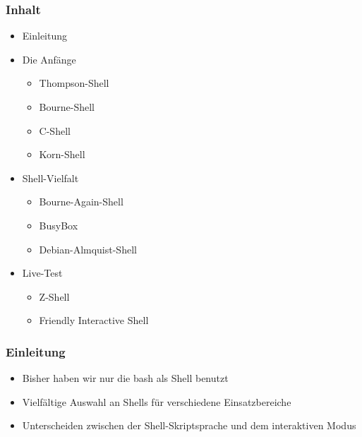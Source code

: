 \begin{frame}
    \titlepage
\end{frame}

\begin{frame}
    \frametitle{Inhalt}
    \begin{itemize}
        \item Einleitung
        \item Die Anfänge
        \begin{itemize}
            \item Thompson-Shell
            \item Bourne-Shell
            \item C-Shell
            \item Korn-Shell
        \end{itemize}
        \pause
        \item Shell-Vielfalt
        \begin{itemize}
            \item Bourne-Again-Shell
            \item BusyBox
            \item Debian-Almquist-Shell
        \end{itemize}
        \pause
        \item Live-Test
        \begin{itemize}
            \item Z-Shell
            \item Friendly Interactive Shell
        \end{itemize}
    \end{itemize}
\end{frame}

\begin{frame}
    \frametitle{Einleitung}
    \begin{itemize}
        \item Bisher haben wir nur die bash als Shell benutzt
        \item Vielfältige Auswahl an Shells für verschiedene Einsatzbereiche
        \item Unterscheiden zwischen der Shell-Skriptsprache und dem interaktiven Modus
    \end{itemize}
\end{frame}
